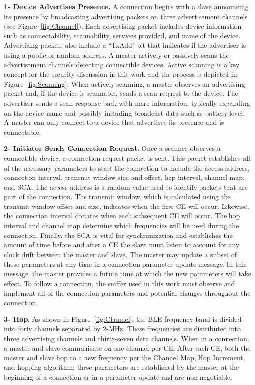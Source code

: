 \documentclass[12pt,letterpaper,oneside]{book}
\begin{document}
				\textbf{1- Device Advertises Presence.} A connection begins with a slave announcing its presence by broadcasting advertising packets on three advertisement channels (see Figure~\ref{fig:Channel}). Each advertising packet includes device information such as connectability, scannability, services provided, and name of the device. Advertising packets also include a ``TxAdd" bit that indicates if the advertiser is using a public or random address. A master actively or passively scans the advertisement channels detecting connectible devices. Active scanning is a key concept for the security discussion in this work and the process is depicted in Figure~\ref{fig:Scanning}. When actively scanning, a master observes an advertising packet and, if the device is scannable, sends a scan request to the device. The advertiser sends a scan response back with more information, typically expanding on the device name and possibly including broadcast data such as battery level. A master can only connect to a device that advertises its presence and is connectable.
				
				\figScanning
				
				\textbf{2- Initiator Sends Connection Request.} Once a scanner observes a connectible device, a connection request packet is sent. This packet establishes all of the necessary parameters to start the connection to include the access address, connection interval, transmit window size and offset, hop interval, channel map, and \ac{SCA}. The access address is a random value used to identify packets that are part of the connection. The transmit window, which is calculated using the transmit window offset and size, indicates when the first \ac{CE} will occur. Likewise, the connection interval dictates when each subsequent \ac{CE} will occur. The hop interval and channel map determine which frequencies will be used during the connection. Finally, the \ac{SCA} is vital for synchronization and establishes the amount of time before and after a \ac{CE} the slave must listen to account for any clock drift between the master and slave. The master may update a subset of these parameters at any time in a connection parameter update message. In this message, the master provides a future time at which the new parameters will take effect. To follow a connection, the sniffer used in this work must observe and implement all of the connection parameters and potential changes throughout the connection.
				
				\textbf{3- Hop.} As shown in Figure~\ref{fig:Channel}, the \ac{BLE} frequency band is divided into forty channels separated by 2-MHz. These frequencies are distributed into three advertising channels and thirty-seven data channels. When in a connection, a master and slave communicate on one channel per \ac{CE}. After each \ac{CE}, both the master and slave hop to a new frequency per the Channel Map, Hop Increment, and hopping algorithm; these parameters are established by the master at the beginning of a connection or in a parameter update and are non-negotiable.
				
\end{document}
